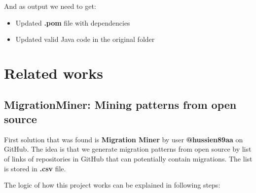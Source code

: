 \documentclass[sigplan,screen,11pt]{acmart}
\begin{document}
And as output we need to get:

\begin{itemize}
    \item Updated \textbf{.pom} file with dependencies
    \item Updated valid Java code in the original folder
\end{itemize}

\section{Related works}

\subsection{MigrationMiner: Mining patterns from open source}

First solution that was found is \textbf{Migration Miner} by user \textbf{@hussien89aa} on GitHub. The idea is that we generate migration patterns from open source by list of links of repositories in GitHub that can potentially contain migrations. The list is stored in \textbf{.csv} file.

The logic of how this project works can be explained in following steps:
\end{document}
